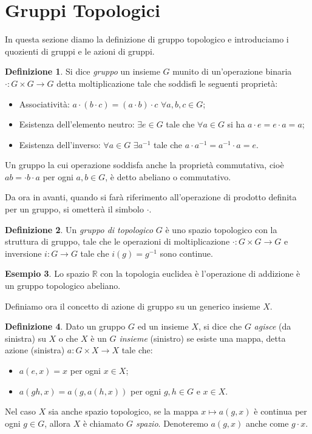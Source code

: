 \documentclass[12pt,a4paper]{report}
\theoremstyle{definition}
\newtheorem{Def}{Definizione}[chapter]
\theoremstyle{Theorem}
\theoremstyle{definition}
\newtheorem{Ex}[Def]{Esempio}
\theoremstyle{definition}
\theoremstyle{definition}
\begin{document}
\section{Gruppi Topologici}
In questa sezione diamo la definizione di gruppo topologico e introduciamo i quozienti di gruppi e le azioni di gruppi.
\begin{Def}
	Si dice \textit{gruppo} un insieme $G$ munito di un'operazione binaria $\cdot:G\times G\rightarrow G$ detta moltiplicazione tale che soddisfi le seguenti proprietà:
	\begin{itemize}
		\item Associatività: $a\cdot (b\cdot c)=(a\cdot b)\cdot c$ $\forall a,b,c\in G$;
		\item Esistenza dell'elemento neutro: $\exists e\in G$ tale che $\forall a\in G$ si ha $a\cdot e=e\cdot a=a$;
		\item Esistenza dell'inverso: $\forall a\in G$ $\exists a^{-1}$ tale che $a\cdot a^{-1}=a^{-1}\cdot a=e$.
	\end{itemize}
	Un gruppo la cui operazione soddisfa anche la proprietà commutativa, cioè $ab=\cdot b\cdot a$ per ogni $a,b\in G$, è detto abeliano o commutativo.
\end{Def}
Da ora in avanti, quando si farà riferimento all'operazione di prodotto definita per un gruppo, si ometterà il simbolo $\cdot$.
\begin{Def}
	Un \textit{gruppo di topologico} $G$ è uno spazio topologico con la struttura di gruppo, tale che le operazioni di moltiplicazione $\cdot:G\times G\rightarrow G$ e inversione $i:G\rightarrow G$ tale che $i(g)=g^{-1}$ sono continue.
\end{Def}
\begin{Ex}
	Lo spazio $\mathbb{R}$ con la topologia euclidea è l'operazione di addizione è un gruppo topologico abeliano.
\end{Ex}
Definiamo ora il concetto di azione di gruppo su un generico insieme $X$.
\begin{Def}
	Dato un gruppo $G$ ed un insieme $X$, si dice che $G$ \textit{agisce} (da sinistra) su $X$ o che $X$ è un \textit{$G$ insieme} (sinistro) se esiste una mappa, detta azione (sinistra) $a:G\times X\rightarrow X$ tale che:
	\begin{itemize}
		\item 	$a(e,x)=x$ per ogni $x\in X$;
		\item $a(gh,x)=a(g,a(h,x))$ per ogni $g,h\in G$ e $x\in X$.
	\end{itemize} 
Nel caso $X$ sia anche spazio topologico, se la mappa $x\longmapsto a(g,x)$ è continua per ogni $g\in G$, allora $X$ è chiamato \textit{$G$ spazio}.
Denoteremo $a(g,x)$ anche come $g\cdot x$.
\end{Def}
\end{document}
